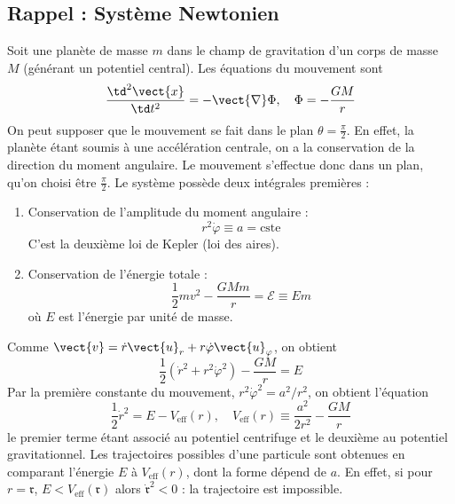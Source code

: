 \subsection{Rappel : Système Newtonien}
Soit une planète de masse $m$ dans le champ de gravitation d'un corps de masse $M$ (générant un potentiel central). Les équations du mouvement sont 
\begin{equation}
    \frac{\td^2 \vect{x}}{\td t^2} = - \vect{\nabla} \Phi, \quad \Phi = - \frac{GM}{r}
\end{equation}
On peut supposer que le mouvement se fait dans le plan $\theta = \frac{\pi}{2}$. En effet, la planète étant soumis à une accélération centrale, on a la conservation de la direction du moment angulaire. Le mouvement s'effectue donc dans un plan, qu'on choisi être $\frac{\pi}{2}$. Le système possède deux intégrales premières :
\begin{enumerate}
    \item Conservation de l'amplitude du moment angulaire :
    \begin{equation}
        r^2 \dot{\varphi} \equiv a = \text{cste}
    \end{equation}
    C'est la deuxième loi de Kepler (loi des aires).
    \item Conservation de l'énergie totale :
    \begin{equation}
        \frac{1}{2} mv^2 - \frac{GMm}{r} = \mathcal{E} \equiv Em
    \end{equation}
    où $E$ est l'énergie par unité de masse. 
\end{enumerate}
Comme $\vect{v} = \dot{r} \vect{u}_r + r \dot{\varphi} \vect{u}_\varphi$, on obtient
\begin{equation}
    \frac{1}{2} (\dot{r}^2+r^2\dot{\varphi}^2) - \frac{GM}{r} = E
\end{equation}
Par la première constante du mouvement, $r^2 \dot{\varphi}^2 = a^2/r^2$, on obtient l'équation
\begin{equation}
    \frac{1}{2} \dot{r}^2 = E - V_\text{eff}(r), \quad V_\text{eff}(r) \equiv \frac{a^2}{2r^2} - \frac{GM}{r}
\end{equation}
le premier terme étant associé au potentiel centrifuge et le deuxième au potentiel gravitationnel. Les trajectoires possibles d'une particule sont obtenues en comparant l'énergie $E$ à $V_\text{eff}(r)$, dont la forme dépend de $a$. En effet, si pour $r=\mathfrak{r}$, $E < V_\text{eff}(\mathfrak{r})$ alors $\dot{\mathfrak{r}}^2 < 0$ : la trajectoire est impossible.\\
